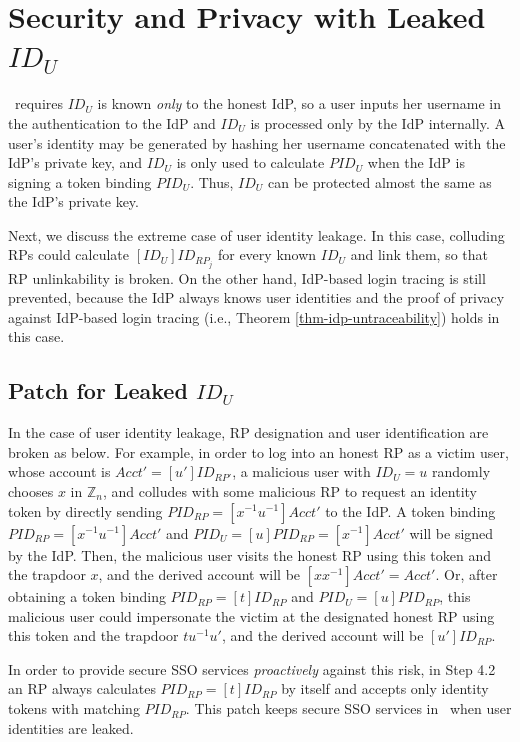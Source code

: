 \appendix

\section{Security and Privacy with Leaked $ID_U$}
\label{sp-leak-uid}
\usso\ requires $ID_U$ is known \emph{only} to the honest IdP,
so a user inputs her username in the authentication to the IdP and $ID_U$ is processed only by the IdP internally.
A user's identity may be generated by hashing her username concatenated with the IdP's private key, 
    and $ID_U$ is only used to calculate $PID_{U}$ when the IdP is signing a token binding $PID_{U}$.
Thus, $ID_U$ can be protected almost the same as the IdP's private key.

Next, we discuss the extreme case of user identity leakage.
In this case,
    colluding RPs could calculate $[ID_U]ID_{RP_j}$ for every known $ID_U$ and link them,
so that RP unlinkability is broken.
On the other hand, IdP-based login tracing is still prevented,
    because the IdP always knows user identities and the proof of privacy against IdP-based login tracing (i.e., Theorem \ref{thm-idp-untraceability}) holds in this case.

\subsection{Patch for Leaked $ID_U$}
In the case of user identity leakage,
RP designation and user identification are broken as below.
For example, in order to log into an honest RP as a victim user, whose account is $Acct' = [u']ID_{RP'}$,
    a malicious user with $ID_U = u$ randomly chooses $x$ in $\mathbb{Z}_n$,
    and colludes with some malicious RP to request an identity token by directly sending $PID_{RP} = [x^{-1}u^{-1}]Acct'$ to the IdP.
A token binding $PID_{RP} = [x^{-1}u^{-1}]Acct'$ and $PID_U = [u]PID_{RP} = [x^{-1}]Acct'$ will be signed by the IdP.
Then, the malicious user visits the honest RP using this token and the trapdoor $x$,
    and the derived account will be $[xx^{-1}]Acct'=Acct'$.
Or, after obtaining a token binding $PID_{RP} = [t]ID_{RP}$ and $PID_U = [u]PID_{RP}$,
    this malicious user could impersonate the victim at the designated honest RP
     using this token and the trapdoor $tu^{-1}u'$, and the derived account will be $[u']ID_{RP}$.

In order to provide secure SSO services \emph{proactively} against this risk,
     in Step 4.2 an RP always calculates $PID_{RP} = [t]ID_{RP}$ by itself and
        accepts only identity tokens with matching $PID_{RP}$.
This patch keeps secure SSO services in \usso\ when user identities are leaked.

